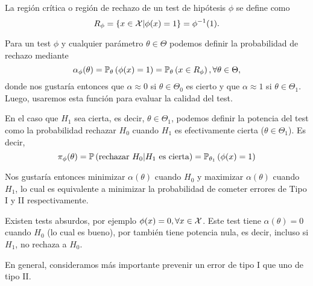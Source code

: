 \begin{definition}
	La región crítica o región de rechazo de un test de hipótesis $\phi$ se define como 
	\begin{equation}
		R_\phi = \{x\in{\mathcal X} | \phi(x)=1\} = \phi^{-1}(1).
	\end{equation}
	
\end{definition}



\begin{definition}
Para un test $\phi$ y cualquier parámetro $\theta\in\Theta$ podemos definir la probabilidad de rechazo mediante
\begin{equation}
 	\alpha_\phi(\theta) = \mathbb{P}_\theta \left(\phi(x)=1\right) = \mathbb{P}_\theta \left(x\in R_\phi\right), \forall\theta\in\Theta,
 \end{equation}
donde nos gustaría entonces que $\alpha\approx 0$ si $\theta\in\Theta_0$ es cierto y que $\alpha\approx 1$ si $\theta\in\Theta_1$. Luego, usaremos esta función para evaluar la calidad del test.
\end{definition}

\begin{definition}
En el caso que $H_1$ sea cierta, es decir, $\theta\in\Theta_1$, podemos definir la potencia del test como la probabilidad rechazar $H_0$ cuando $H_1$ es efectivamente cierta ($\theta\in\Theta_1$). Es decir,
\begin{equation}
 	\pi_\phi(\theta) = \mathbb{P} \left(\text{rechazar } H_0 | H_1 \text{ es cierta}\right)  = \mathbb{P}_{\theta_1} \left(\phi(x)=1\right)
 \end{equation}
 \end{definition}
Nos gustaría entonces minimizar $\alpha(\theta)$ cuando $H_0$ y maximizar $\alpha(\theta)$ cuando $H_1$, lo cual es equivalente a minimizar la probabilidad de cometer errores de Tipo I y II respectivamente. 


\begin{example}
	Existen tests absurdos, por ejemplo $\phi(x) = 0,\forall x\in{\mathcal X}$. Este test tiene $\alpha(\theta)=0$ cuando $H_0$ (lo cual es bueno), por también tiene potencia nula, es decir, incluso si $H_1$, no rechaza a $H_0$. 
 \end{example} 
 En general, consideramos más importante prevenir un error de tipo I que uno de tipo II. 

